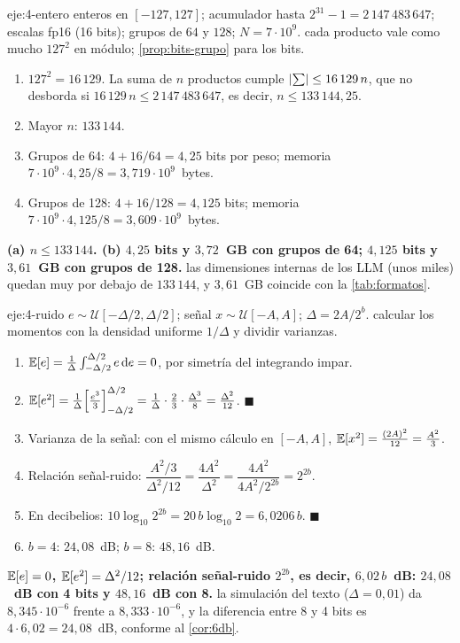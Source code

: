 \begin{solucion}{eje:4-entero}
\datos enteros en $[-127,127]$; acumulador hasta $2^{31}-1=2\,147\,483\,647$; escalas fp16 (16 bits); grupos de $64$ y $128$; $N=7\cdot 10^{9}$.
\planteamiento cada producto vale como mucho $127^{2}$ en módulo; \cref{prop:bits-grupo} para los bits.
\pasos
\begin{enumerate}[label=\arabic*.]
  \item $127^{2}=16\,129$. La suma de $n$ productos cumple $\lvert\sum\rvert\le 16\,129\,n$, que no desborda si $16\,129\,n\le 2\,147\,483\,647$, es decir, $n\le 133\,144{,}25$.
  \item Mayor $n$: $133\,144$.
  \item Grupos de 64: $4+16/64=4{,}25$ bits por peso; memoria $7\cdot 10^{9}\cdot 4{,}25/8=3{,}719\cdot 10^{9}$~bytes.
  \item Grupos de 128: $4+16/128=4{,}125$ bits; memoria $7\cdot 10^{9}\cdot 4{,}125/8=3{,}609\cdot 10^{9}$~bytes.
\end{enumerate}
\resultado \textbf{(a) $n\le 133\,144$. (b) $4{,}25$ bits y $3{,}72$~GB con grupos de 64; $4{,}125$ bits y $3{,}61$~GB con grupos de 128.}
\comprobacion las dimensiones internas de los LLM (unos miles) quedan muy por debajo de $133\,144$, y $3{,}61$~GB coincide con la \cref{tab:formatos}.
\end{solucion}

\begin{solucion}{eje:4-ruido}
\datos $e\sim\mathcal{U}[-\Delta/2,\Delta/2]$; señal $x\sim\mathcal{U}[-A,A]$; $\Delta=2A/2^{b}$.
\planteamiento calcular los momentos con la densidad uniforme $1/\Delta$ y dividir varianzas.
\pasos
\begin{enumerate}[label=\arabic*.]
  \item $\mathbb{E}[e]=\frac{1}{\Delta}\int_{-\Delta/2}^{\Delta/2}e\,\mathrm{d}e=0$, por simetría del integrando impar.
  \item $\mathbb{E}[e^{2}]=\frac{1}{\Delta}\Bigl[\frac{e^{3}}{3}\Bigr]_{-\Delta/2}^{\Delta/2}=\frac{1}{\Delta}\cdot\frac{2}{3}\cdot\frac{\Delta^{3}}{8}=\frac{\Delta^{2}}{12}$. \hfill$\blacksquare$
  \item Varianza de la señal: con el mismo cálculo en $[-A,A]$, $\mathbb{E}[x^{2}]=\frac{(2A)^{2}}{12}=\frac{A^{2}}{3}$.
  \item Relación señal-ruido: $\dfrac{A^{2}/3}{\Delta^{2}/12}=\dfrac{4A^{2}}{\Delta^{2}}=\dfrac{4A^{2}}{4A^{2}/2^{2b}}=2^{2b}$.
  \item En decibelios: $10\log_{10}2^{2b}=20\,b\log_{10}2=6{,}0206\,b$. \hfill$\blacksquare$
  \item $b=4$: $24{,}08$~dB; $b=8$: $48{,}16$~dB.
\end{enumerate}
\resultado \textbf{$\mathbb{E}[e]=0$, $\mathbb{E}[e^{2}]=\Delta^{2}/12$; relación señal-ruido $2^{2b}$, es decir, $6{,}02\,b$~dB: $24{,}08$~dB con 4 bits y $48{,}16$~dB con 8.}
\comprobacion la simulación del texto ($\Delta=0{,}01$) da $8{,}345\cdot 10^{-6}$ frente a $8{,}333\cdot 10^{-6}$, y la diferencia entre 8 y 4 bits es $4\cdot 6{,}02=24{,}08$~dB, conforme al \cref{cor:6db}.
\end{solucion}

